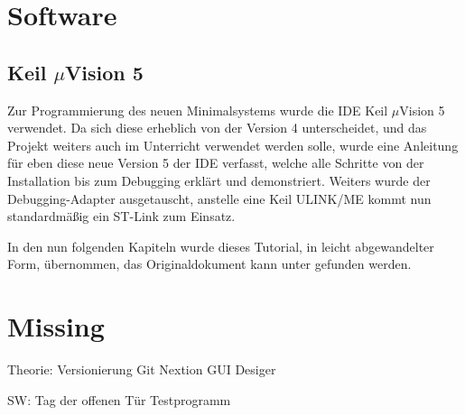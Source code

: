 \newcommand*{\uVision}{$\mu$Vision}

\clearpage
{}
\section{Software}
\label{sec:software}

\subsection{Keil \uVision{} 5}
\label{sec:uvision-5}

Zur Programmierung des neuen \gls{Minimalsystem}s wurde die \gls{IDE} Keil \uVision{} 5 verwendet. Da sich diese erheblich von der Version 4 unterscheidet, und das Projekt weiters auch im Unterricht verwendet werden solle, wurde eine Anleitung für eben diese neue Version 5 der \gls{IDE} verfasst, welche alle Schritte von der Installation bis zum \gls{Debugging} erklärt und demonstriert. Weiters wurde der \gls{Debugging}-Adapter ausgetauscht, anstelle eine \gls{Keil} ULINK/ME kommt nun standardmäßig ein ST-Link zum Einsatz.

In den nun folgenden Kapiteln wurde dieses Tutorial, in leicht abgewandelter Form, übernommen, das Originaldokument kann unter \cite{doku:tutorial} gefunden werden.





\section{Missing}
Theorie:
Versionierung
Git
Nextion GUI Desiger

SW:
Tag der offenen Tür
Testprogramm